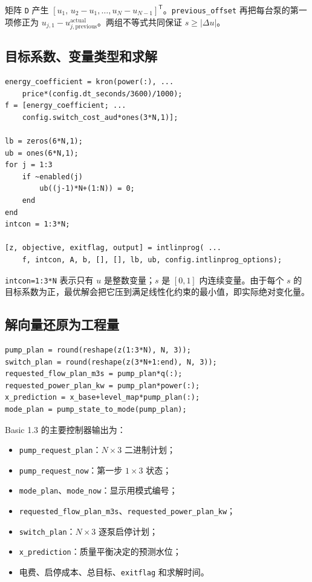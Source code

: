 \documentclass[UTF8,a4paper,11pt]{ctexart}
\newcommand{\code}[1]{\texttt{#1}}
\begin{document}
矩阵 \code{D} 产生 $[u_1,\,u_2-u_1,\dots,u_N-u_{N-1}]^\mathsf{T}$。\code{previous\_offset} 再把每台泵的第一项修正为 $u_{j,1}-u^{\mathrm{actual}}_{j,\mathrm{previous}}$。两组不等式共同保证 $s\ge|\Delta u|$。

\subsection{目标系数、变量类型和求解}

\begin{lstlisting}[caption={MILP 目标与 intlinprog 调用}]
energy_coefficient = kron(power(:), ...
    price*(config.dt_seconds/3600)/1000);
f = [energy_coefficient; ...
    config.switch_cost_aud*ones(3*N,1)];

lb = zeros(6*N,1);
ub = ones(6*N,1);
for j = 1:3
    if ~enabled(j)
        ub((j-1)*N+(1:N)) = 0;
    end
end
intcon = 1:3*N;

[z, objective, exitflag, output] = intlinprog( ...
    f, intcon, A, b, [], [], lb, ub, config.intlinprog_options);
\end{lstlisting}

\code{intcon=1:3*N} 表示只有 $u$ 是整数变量；$s$ 是 $[0,1]$ 内连续变量。由于每个 $s$ 的目标系数为正，最优解会把它压到满足线性化约束的最小值，即实际绝对变化量。

\subsection{解向量还原为工程量}

\begin{lstlisting}[caption={把求解器向量恢复为泵计划、流量、功率和水位}]
pump_plan = round(reshape(z(1:3*N), N, 3));
switch_plan = round(reshape(z(3*N+1:end), N, 3));
requested_flow_plan_m3s = pump_plan*q(:);
requested_power_plan_kw = pump_plan*power(:);
x_prediction = x_base+level_map*pump_plan(:);
mode_plan = pump_state_to_mode(pump_plan);
\end{lstlisting}

Basic 1.3 的主要控制器输出为：

\begin{itemize}
  \item \code{pump\_request\_plan}：$N\times3$ 二进制计划；
  \item \code{pump\_request\_now}：第一步 $1\times3$ 状态；
  \item \code{mode\_plan}、\code{mode\_now}：显示用模式编号；
  \item \code{requested\_flow\_plan\_m3s}、\code{requested\_power\_plan\_kw}；
  \item \code{switch\_plan}：$N\times3$ 逐泵启停计划；
  \item \code{x\_prediction}：质量平衡决定的预测水位；
  \item 电费、启停成本、总目标、\code{exitflag} 和求解时间。
\end{itemize}
\end{document}
